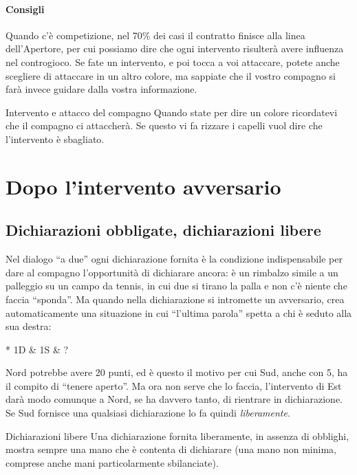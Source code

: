 \documentclass[../corsofiori.tex]{subfiles}
\begin{document}
\subsubsection{Consigli}

Quando c’è competizione, nel 70\% dei casi il contratto finisce alla linea
dell’Apertore, per cui possiamo dire che ogni intervento risulterà avere influenza nel
controgioco. Se fate un intervento, e poi tocca a voi attaccare, potete anche
scegliere di attaccare in un altro colore, ma sappiate che il vostro compagno si farà
invece guidare dalla vostra informazione.

\begin{regola}{Intervento e attacco del compagno}
Quando state per dire un colore ricordatevi che il compagno
ci attaccherà. Se questo vi fa rizzare i capelli vuol dire
che l’intervento è sbagliato.
\end{regola}

\chapter{Dopo l'intervento avversario}

\section{Dichiarazioni obbligate, dichiarazioni libere}

Nel dialogo “a due” ogni dichiarazione fornita è la condizione indispensabile per
dare al compagno l’opportunità di dichiarare ancora: è un rimbalzo simile a un
palleggio su un campo da tennis, in cui due si tirano la palla e non c’è niente che
faccia “sponda”. Ma quando nella dichiarazione si intromette un avversario, crea
automaticamente una situazione in cui “l’ultima parola” spetta a chi è seduto alla
sua destra:

\begin{bidding}*
    1D & 1S & ?\\
\end{bidding}


Nord potrebbe avere 20 punti, ed è questo il motivo per cui Sud,
anche con 5, ha il compito di “tenere aperto”. Ma ora non serve
che lo faccia, l’intervento di Est darà modo comunque a Nord,
se ha davvero tanto, di rientrare in dichiarazione. Se Sud
fornisce una qualsiasi dichiarazione lo fa quindi \emph{liberamente}.

\begin{regola}{Dichiarazioni libere}
Una dichiarazione fornita liberamente,
in assenza di obblighi, mostra sempre una mano
che è contenta di dichiarare (una mano non minima, comprese anche mani particolarmente sbilanciate).
\end{regola}
\end{document}
